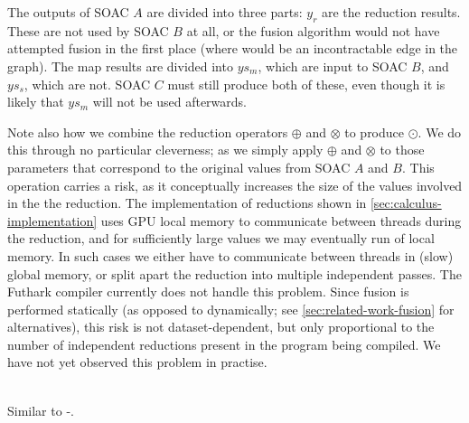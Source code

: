 \begin{description}
  The outputs of SOAC $A$ are divided into three parts: $y_{r}$ are
  the reduction results.  These are not used by SOAC $B$ at all, or
  the fusion algorithm would not have attempted fusion in the first
  place (where would be an incontractable edge in the graph).  The map
  results are divided into $ys_{m}$, which are input to SOAC $B$, and
  $ys_{s}$, which are not.  SOAC $C$ must still produce both of these,
  even though it is likely that $ys_{m}$ will not be used afterwards.

  Note also how we combine the reduction operators $\oplus$ and
  $\otimes$ to produce $\odot$.  We do this through no particular
  cleverness; as we simply apply $\oplus$ and $\otimes$ to those
  parameters that correspond to the original values from SOAC $A$ and
  $B$.  This operation carries a risk, as it conceptually increases
  the size of the values involved in the the reduction.  The
  implementation of reductions shown in
  \cref{sec:calculus-implementation} uses GPU local memory to
  communicate between threads during the reduction, and for
  sufficiently large values we may eventually run of local memory.  In
  such cases we either have to communicate between threads in (slow)
  global memory, or split apart the reduction into multiple
  independent passes.  The Futhark compiler currently does not handle
  this problem.  Since fusion is performed statically (as opposed to
  dynamically; see \cref{sec:related-work-fusion} for alternatives),
  this risk is not dataset-dependent, but only proportional to the
  number of independent reductions present in the program being
  compiled.  We have not yet observed this problem in practise.

\item[\kw{scanomap}-\kw{scanomap}]\hfill\\

  Similar to -.


\end{description}
